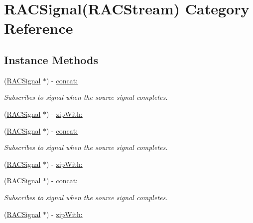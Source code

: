 \hypertarget{category_r_a_c_signal_07_r_a_c_stream_08}{}\section{R\+A\+C\+Signal(R\+A\+C\+Stream) Category Reference}
\label{category_r_a_c_signal_07_r_a_c_stream_08}
\subsection*{Instance Methods}
\begin{DoxyCompactItemize}
\item 
\mbox{\label{category_r_a_c_signal_07_r_a_c_stream_08_a7d49c1cd1eedbe5737835ad1a07075dd}} 
(\mbox{\hyperlink{interface_r_a_c_signal}{R\+A\+C\+Signal}} $\ast$) -\/ \mbox{\hyperlink{category_r_a_c_signal_07_r_a_c_stream_08_a7d49c1cd1eedbe5737835ad1a07075dd}{concat\+:}}
\begin{DoxyCompactList}\small\item\em Subscribes to {\ttfamily signal} when the source signal completes. \end{DoxyCompactList}\item 
(\mbox{\hyperlink{interface_r_a_c_signal}{R\+A\+C\+Signal}} $\ast$) -\/ \mbox{\hyperlink{category_r_a_c_signal_07_r_a_c_stream_08_ac822f657df311327de76bc55bcae689d}{zip\+With\+:}}
\item 
\mbox{\label{category_r_a_c_signal_07_r_a_c_stream_08_a7d49c1cd1eedbe5737835ad1a07075dd}} 
(\mbox{\hyperlink{interface_r_a_c_signal}{R\+A\+C\+Signal}} $\ast$) -\/ \mbox{\hyperlink{category_r_a_c_signal_07_r_a_c_stream_08_a7d49c1cd1eedbe5737835ad1a07075dd}{concat\+:}}
\begin{DoxyCompactList}\small\item\em Subscribes to {\ttfamily signal} when the source signal completes. \end{DoxyCompactList}\item 
(\mbox{\hyperlink{interface_r_a_c_signal}{R\+A\+C\+Signal}} $\ast$) -\/ \mbox{\hyperlink{category_r_a_c_signal_07_r_a_c_stream_08_ac822f657df311327de76bc55bcae689d}{zip\+With\+:}}
\item 
\mbox{\label{category_r_a_c_signal_07_r_a_c_stream_08_a7d49c1cd1eedbe5737835ad1a07075dd}} 
(\mbox{\hyperlink{interface_r_a_c_signal}{R\+A\+C\+Signal}} $\ast$) -\/ \mbox{\hyperlink{category_r_a_c_signal_07_r_a_c_stream_08_a7d49c1cd1eedbe5737835ad1a07075dd}{concat\+:}}
\begin{DoxyCompactList}\small\item\em Subscribes to {\ttfamily signal} when the source signal completes. \end{DoxyCompactList}\item 
(\mbox{\hyperlink{interface_r_a_c_signal}{R\+A\+C\+Signal}} $\ast$) -\/ \mbox{\hyperlink{category_r_a_c_signal_07_r_a_c_stream_08_ac822f657df311327de76bc55bcae689d}{zip\+With\+:}}
\end{DoxyCompactItemize}
